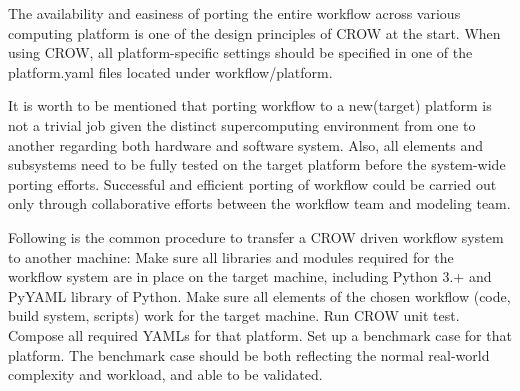 The availability and easiness of porting the entire workflow across various computing platform is one of the design principles of C\-R\-O\-W at the start. When using C\-R\-O\-W, all platform-\/specific settings should be specified in one of the platform.\-yaml files located under workflow/platform.

It is worth to be mentioned that porting workflow to a new(target) platform is not a trivial job given the distinct supercomputing environment from one to another regarding both hardware and software system. Also, all elements and subsystems need to be fully tested on the target platform before the system-\/wide porting efforts. Successful and efficient porting of workflow could be carried out only through collaborative efforts between the workflow team and modeling team.

Following is the common procedure to transfer a C\-R\-O\-W driven workflow system to another machine\-: Make sure all libraries and modules required for the workflow system are in place on the target machine, including Python 3.+ and Py\-Y\-A\-M\-L library of Python. Make sure all elements of the chosen workflow (code, build system, scripts) work for the target machine. Run C\-R\-O\-W unit test. Compose all required Y\-A\-M\-Ls for that platform. Set up a benchmark case for that platform. The benchmark case should be both reflecting the normal real-\/world complexity and workload, and able to be validated. 
